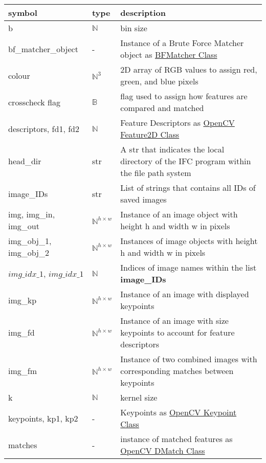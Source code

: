 \documentclass[12pt, titlepage]{article}
\begin{document}
\renewcommand{\arraystretch}{1.2}
\noindent 
\begin{longtable*}{l l p{12cm}} 
  \toprule
\textbf{symbol} & \textbf{type} & \textbf{description}\\
\midrule 
b & $\mathbb{N}$ & bin size\\
bf\_matcher\_object & - & Instance of a Brute Force Matcher object as \href{https://docs.opencv.org/3.4/d3/da1/classcv_1_1BFMatcher.html}{BFMatcher Class}\\
colour & $\mathbb{N}^{3}$ & 2D array of RGB values to assign red, green, and blue pixels\\
crosscheck flag & $\mathbb{B}$ & flag used to assign how features are compared and matched\\
descriptors, fd1, fd2 & $\mathbb{N}$ &	Feature Descriptors as \href{https://docs.opencv.org/4.x/d0/d13/classcv_1_1Feature2D.html}{OpenCV Feature2D Class}\\
head\_dir	& str	& A str that indicates the local directory of the IFC program within the file path system\\
image\_IDs & str & List of strings that contains all IDs of saved images\\
img, img\_in, img\_out & $\mathbb{N}^{h \times w}$& Instance of an image object with height h and width w in pixels\\
img\_obj\_1, img\_obj\_2 & $\mathbb{N}^{h \times w}$& Instances of image objects with height h and width w in pixels\\
$img\_idx\_1$, $img\_idx\_1$ & $\mathbb{N}$ & Indices of image names within the list \textbf{image\_IDs}\\
img\_kp	& $\mathbb{N}^{h \times w}$	& Instance of an image with displayed keypoints\\
img\_fd	& $\mathbb{N}^{h \times w}$	& Instance of an image with size keypoints to account for feature descriptors\\
img\_fm	& $\mathbb{N}^{h \times w}$ & Instance of two combined images with corresponding matches between keypoints\\
k & $\mathbb{N}$ & kernel size \\
keypoints, kp1, kp2 & - & Keypoints as \href{https://docs.opencv.org/3.4/d2/d29/classcv_1_1KeyPoint.html}{OpenCV Keypoint Class}\\
matches & - & instance of matched features as \href{https://docs.opencv.org/3.4/d4/de0/classcv_1_1DMatch.html}{OpenCV DMatch Class} \\

\end{longtable*}
\end{document}
